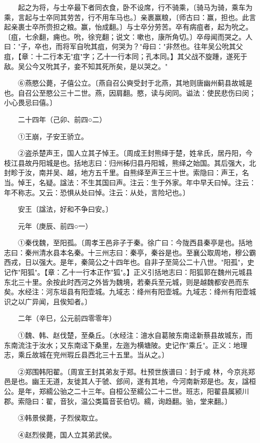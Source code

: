 　　起之为将，与士卒最下者同衣食，卧不设席，行不骑乘，〔骑马为骑，乘车为乘，言起与士卒同其劳苦，行不用车马也。〕亲裹赢粮，〔师古曰：赢，担也。此言起亲裹士卒所赍担之粮。赢，怡成翻。〕与士卒分劳苦。卒有病疽者，起为吮之。〔疽，七余翻，痈也。吮，徐兖翻；说文：嗽也，康所角切。〕卒母闻而哭之。人曰："子，卒也，而将军自吮其疽，何哭为？"母曰："非然也。往年吴公吮其父疽，【章：十二行本无"疽"字；乙十一行本同；孔本同。】其父战不旋踵，遂死于敌。吴公今又吮其子，妾不知其死所矣，是以哭之。"

　　⑥燕愍公薨，子僖公立。〔燕自召公奭受封于北燕，其地则唐幽州蓟县故城是也。自召公至愍公三十二世。燕，因肩翻。愍，读与闵同。谥法：使民悲伤曰闵；小心畏忌曰僖。〕

　　二十四年（己卯、前四○二）

　　①王崩，子安王骄立。

　　②盗杀楚声王，国人立其子悼王。〔周成王封熊绎于楚，姓芈氏，居丹阳，今枝江县故丹阳城是也。括地志曰：归州秭归县丹阳城，熊绎之始国。其后强大，北封畛于汝，南并吴、越，地方五千里。自熊绎至声王三十世。索隐曰：声王，名当。悼王，名疑。諡法：不生其国曰声。注云：生于外家。年中早夭曰悼。注云：年不称志。又云：恐惧从处曰悼。注云：从处，言险圮也。〕

　　安王〔諡法，好和不争曰安。〕

　　元年（庚辰、前四○一）

　　①秦伐魏，至阳孤。〔周孝王邑非子于秦。徐广曰：今陇西县秦亭是也。括地志曰：秦州清水县本名秦。十三州志曰：秦亭，秦谷是也。至襄公取周地，穆公霸西戎，日以强大。是年，秦简公之十四年也。自非子至简公二十八世。"阳孤"，史记作"阳狐"。【章：乙十一行本正作"狐"。】正义引括地志曰：阳狐郭在魏州元城县东北三十里。余按此时西河之外皆为魏境，若秦兵至元城，则是越魏都安邑而东矣。水经注：河东垣县有阳壶城。九域志：绛州有阳壶城。九域志：绛州有阳壶城识之以广异闻，且俟知者。〕

　　二年（辛巳，公元前四零零年）

　　①魏、韩、赵伐楚，至桑丘。〔水经注：澺水自葛陂东南迳新蔡县故城东，而东南流注于汝水；又东南迳下桑里，左迤为横塘陂。史记作"乘丘"。正义：地理志，乘丘故城在兖州瑕丘县西北三十五里。当从之。〕

　　②郑围韩阳翟。〔周宣王封其弟友于郑。杜预世族谱曰：封于咸 林，今京兆郑邑是也。幽王无道，友徙其人于虢、郐间，遂有其地，今河南新郑是也。友，諡桓公。是年，郑繻公骀之二十三年。自桓公至繻公二十二世。班志，阳翟县属颍川郡。索隐曰：翟，音狄，温公类篇音苌伯切。繻，询趋翻。骀，堂来翻。〕

　　③韩景侯薨，子烈侯取立。

　　④赵烈侯薨，国人立其弟武侯。

